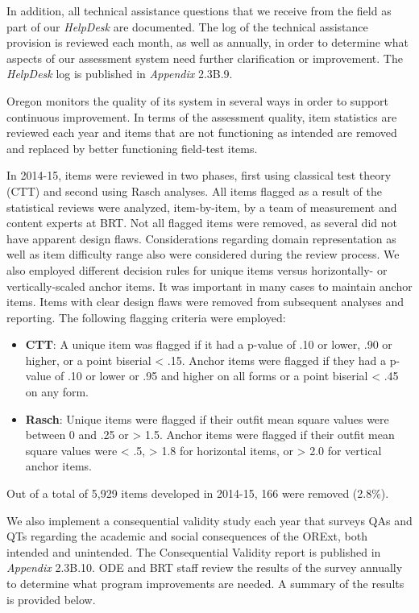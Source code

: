 \documentclass[]{article}
\providecommand{\tightlist}{%
  \setlength{\itemsep}{0pt}\setlength{\parskip}{0pt}}
\begin{document}
In addition, all technical assistance questions that we receive from the
field as part of our \emph{HelpDesk} are documented. The log of the
technical assistance provision is reviewed each month, as well as
annually, in order to determine what aspects of our assessment system
need further clarification or improvement. The \emph{HelpDesk} log is
published in \emph{Appendix} 2.3B.9.

Oregon monitors the quality of its system in several ways in order to
support continuous improvement. In terms of the assessment quality, item
statistics are reviewed each year and items that are not functioning as
intended are removed and replaced by better functioning field-test
items.

In 2014-15, items were reviewed in two phases, first using classical
test theory (CTT) and second using Rasch analyses. All items flagged as
a result of the statistical reviews were analyzed, item-by-item, by a
team of measurement and content experts at BRT. Not all flagged items
were removed, as several did not have apparent design flaws.
Considerations regarding domain representation as well as item
difficulty range also were considered during the review process. We also
employed different decision rules for unique items versus horizontally-
or vertically-scaled anchor items. It was important in many cases to
maintain anchor items. Items with clear design flaws were removed from
subsequent analyses and reporting. The following flagging criteria were
employed:

\begin{itemize}
\tightlist
\item
  \textbf{CTT}: A unique item was flagged if it had a p-value of .10 or
  lower, .90 or higher, or a point biserial \textless{} .15. Anchor
  items were flagged if they had a p-value of .10 or lower or .95 and
  higher on all forms or a point biserial \textless{} .45 on any form.
\item
  \textbf{Rasch}: Unique items were flagged if their outfit mean square
  values were between 0 and .25 or \textgreater{} 1.5. Anchor items were
  flagged if their outfit mean square values were \textless{} .5,
  \textgreater{} 1.8 for horizontal items, or \textgreater{} 2.0 for
  vertical anchor items.
\end{itemize}

Out of a total of 5,929 items developed in 2014-15, 166 were removed
(2.8\%).

We also implement a consequential validity study each year that surveys
QAs and QTs regarding the academic and social consequences of the ORExt,
both intended and unintended. The Consequential Validity report is
published in \emph{Appendix} 2.3B.10. ODE and BRT staff review the
results of the survey annually to determine what program improvements
are needed. A summary of the results is provided below.
\end{document}

